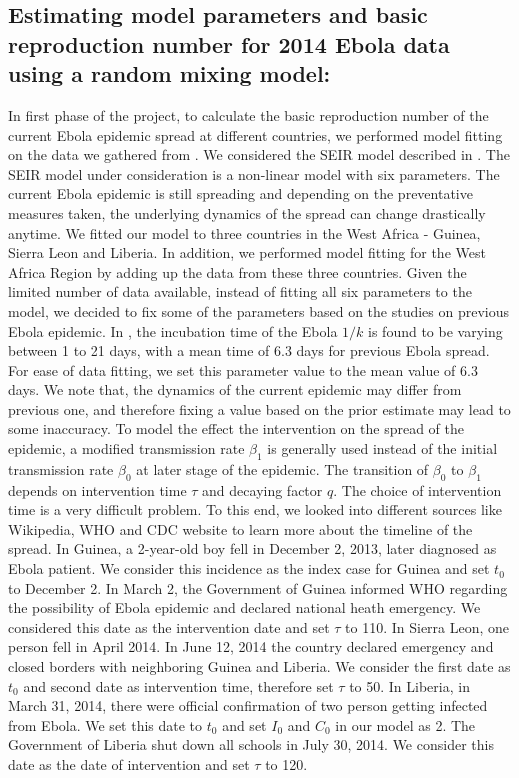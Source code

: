 \documentclass[10pt, journal,onecolumn]{IEEEtran}
\begin{document}
\subsection*{\textbf{Estimating model parameters and basic reproduction number for 2014 Ebola data using a random mixing model:}}

In first phase of the project, to calculate the basic reproduction number of the current Ebola epidemic spread at different countries, we performed model fitting on the data we gathered from \cite{cmriversdata}. We considered the SEIR model described in \cite{chowell2004basic}. The SEIR model under consideration is a non-linear model with six parameters. The current Ebola epidemic is still spreading and depending on the preventative measures  taken, the underlying dynamics of the spread can change drastically anytime. We fitted our model to three countries in the West Africa - Guinea, Sierra Leon and Liberia. In addition, we performed model fitting for the West Africa Region by adding up the data from these three countries. Given the limited number of data available, instead of fitting all six parameters to the model, we decided to fix some of the parameters based on the studies on previous Ebola epidemic. In \cite{chowell2004basic}, the incubation time of the Ebola $1/k$ is found to be varying between 1 to 21 days, with a mean time of 6.3 days for previous Ebola spread. For ease of data fitting, we set this parameter value to the mean value of 6.3 days. We note that, the dynamics of the current epidemic may differ from previous one, and therefore fixing a value based on the prior estimate may lead to some inaccuracy. To model the effect the intervention on the spread of the epidemic, a modified transmission rate $\beta_1$ is generally used instead of the initial transmission rate $\beta_0$ at later stage of the epidemic. The transition of $\beta_0$ to $\beta_1$ depends on intervention time $\tau$ and decaying factor $q$. The choice of intervention time is a very difficult problem. To this end, we looked into different sources like Wikipedia, WHO and CDC website to learn more about the timeline of the spread. In Guinea, a 2-year-old boy fell in December 2, 2013, later diagnosed as Ebola patient. We consider this incidence as the index case for Guinea and set $t_0$ to December 2. In March 2, the Government of Guinea informed WHO regarding the possibility of Ebola epidemic and declared national heath emergency. We considered this date as the intervention date and set $\tau$ to 110. In Sierra Leon, one person fell in April 2014. In June 12, 2014 the country declared emergency and closed borders with neighboring Guinea and Liberia. We consider the first date as $t_0$ and second date as intervention time, therefore set $\tau$ to 50. In Liberia, in March 31, 2014, there were official confirmation of two person getting infected from Ebola. We set this date to $t_0$ and set $I_0$ and $C_0$ in our model as 2. The Government of Liberia shut down all schools in July 30, 2014. We consider this date as the date of intervention and set $\tau$ to 120.
\end{document}
